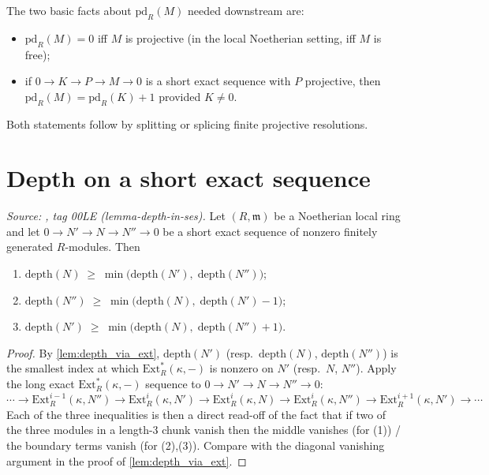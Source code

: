 The two basic facts about \(\text{pd}_R(M)\) needed downstream are:
\begin{itemize}
  \item \(\text{pd}_R(M) = 0\) iff \(M\) is projective (in the local Noetherian setting,
    iff \(M\) is free);
  \item if \(0 \to K \to P \to M \to 0\) is a short exact sequence with \(P\) projective, then
    \(\text{pd}_R(M) = \text{pd}_R(K) + 1\) provided \(K \neq 0\).
\end{itemize}
Both statements follow by splitting or splicing finite projective resolutions.

\section{Depth on a short exact sequence}
\label{sec:ab_depth_ses}

\begin{lemma}\leanok
  \label{lem:depth_short_exact_sequence}

  \textit{Source: \cite{stacks-project}, tag 00LE (lemma-depth-in-ses).}
  Let \((R, \mathfrak{m})\) be a Noetherian local ring and let
  \(0 \to N' \to N \to N'' \to 0\) be a short exact sequence of nonzero finitely generated
  \(R\)-modules. Then
  \begin{enumerate}
    \item \(\text{depth}(N) \;\geq\; \min\bigl(\text{depth}(N'),\; \text{depth}(N'')\bigr)\);
    \item \(\text{depth}(N'') \;\geq\; \min\bigl(\text{depth}(N),\; \text{depth}(N') - 1\bigr)\);
    \item \(\text{depth}(N') \;\geq\; \min\bigl(\text{depth}(N),\; \text{depth}(N'') + 1\bigr)\).
  \end{enumerate}
\end{lemma}

\begin{proof}





\leanok
  By \cref{lem:depth_via_ext}, \(\text{depth}(N')\) (resp.\ \(\text{depth}(N)\),
  \(\text{depth}(N'')\)) is the smallest index at which \(\text{Ext}^*_R(\kappa, -)\) is
  nonzero on \(N'\) (resp.\ \(N\), \(N''\)). Apply the long exact \(\text{Ext}^*_R(\kappa, -)\)
  sequence to \(0 \to N' \to N \to N'' \to 0\):
  \[
    \cdots \to \text{Ext}^{i-1}_R(\kappa, N'')
    \to \text{Ext}^i_R(\kappa, N')
    \to \text{Ext}^i_R(\kappa, N)
    \to \text{Ext}^i_R(\kappa, N'')
    \to \text{Ext}^{i+1}_R(\kappa, N') \to \cdots
  \]
  Each of the three inequalities is then a direct read-off of the fact that if two
  of the three modules in a length-3 chunk vanish then the middle vanishes (for (1)) /
  the boundary terms vanish (for (2),(3)). Compare with the diagonal vanishing argument in
  the proof of \cref{lem:depth_via_ext}.
\end{proof}

